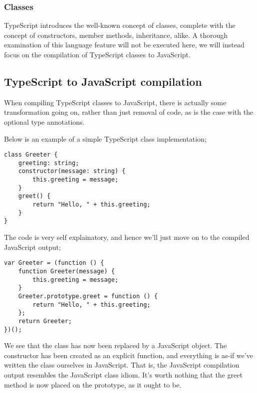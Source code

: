 \subsubsection*{Classes}
TypeScript introduces the well-known concept of classes, complete with the concept of constructors, member methods, inheritance, alike.
A thorough examination of this language feature will not be executed here, we will instead focus on the compilation of TypeScript classes to JavaScript.

\subsection*{TypeScript to JavaScript compilation}
When compiling TypeScript classes to JavaScript, there is actually some transformation going on, rather than just removal of code, as is the case with the optional type annotations.

Below is an example of a simple TypeScript class implementation;
\begin{verbatim}
class Greeter {
    greeting: string;
    constructor(message: string) {
        this.greeting = message;
    }
    greet() {
        return "Hello, " + this.greeting;
    }
}
\end{verbatim}
The code is very self explainatory, and hence we'll just move on to the compiled JavaScript output;
\begin{verbatim}
var Greeter = (function () {
    function Greeter(message) {
        this.greeting = message;
    }
    Greeter.prototype.greet = function () {
        return "Hello, " + this.greeting;
    };
    return Greeter;
})();
\end{verbatim}
We see that the class has now been replaced by a JavaScript object.
The constructor has been created as an explicit function, and everything is as-if we've written the class ourselves in JavaScript.
That is, the JavaScript compilation output resembles the JavaScript class idiom.
It's worth nothing that the greet method is now placed on the prototype, as it ought to be.

